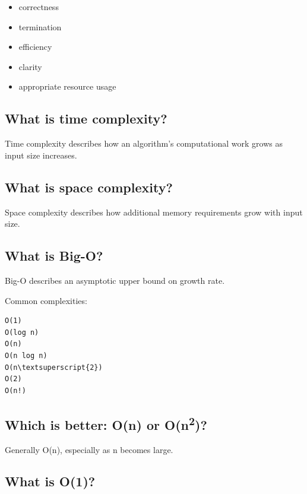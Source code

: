 \begin{itemize}
  \item correctness
  \item termination
  \item efficiency
  \item clarity
  \item appropriate resource usage
\end{itemize}

\medskip

\subsection{What is time complexity?}

Time complexity describes how an algorithm's computational work grows as input size increases.

\medskip

\subsection{What is space complexity?}

Space complexity describes how additional memory requirements grow with input size.

\medskip

\subsection{What is Big-O?}

Big-O describes an asymptotic upper bound on growth rate.

Common complexities:

\begin{lstlisting}
O(1)
O(log n)
O(n)
O(n log n)
O(n\textsuperscript{2})
O(2)
O(n!)
\end{lstlisting}

\medskip

\subsection{Which is better: O(n) or O(n\textsuperscript{2})?}

Generally O(n), especially as n becomes large.

\medskip

\subsection{What is O(1)?}

